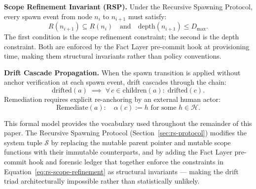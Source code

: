 \medskip
\noindent\textbf{Scope Refinement Invariant (RSP).}
Under the Recursive Spawning Protocol, every spawn event from node $n_i$ to $n_{i+1}$ must satisfy:
\begin{equation}
R(n_{i+1}) \subseteq R(n_i) \quad\text{and}\quad \mathrm{depth}(n_{i+1}) \leq D_{\max}.
\label{eq:rs-scope-refinement}
\end{equation}
The first condition is the scope refinement constraint; the second is the depth constraint. Both are enforced by the Fact Layer pre-commit hook at provisioning time, making them structural invariants rather than policy conventions.

\medskip
\noindent\textbf{Drift Cascade Propagation.}
When the spawn transition is applied without anchor verification at each spawn event, drift cascades through the chain:
\begin{equation}
\mathrm{drifted}(a) \;\implies\; \forall\, c \in \mathrm{children}(a):\; \mathrm{drifted}(c).
\label{eq:rs-drift-propagation}
\end{equation}
Remediation requires explicit re-anchoring by an external human actor:
\begin{equation}
\mathrm{Remediate}(a):\quad \alpha(c) := h \text{ for some } h \in \mathcal{H}.
\label{eq:rs-drift-remediation}
\end{equation}

This formal model provides the vocabulary used throughout the remainder of this paper. The Recursive Spawning Protocol (Section~\ref{sec:rs-protocol}) modifies the system tuple $\mathcal{S}$ by replacing the mutable parent pointer and mutable scope functions with their immutable counterparts, and by adding the Fact Layer pre-commit hook and forensic ledger that together enforce the constraints in Equation~\ref{eq:rs-scope-refinement} as structural invariants — making the drift triad architecturally impossible rather than statistically unlikely.
